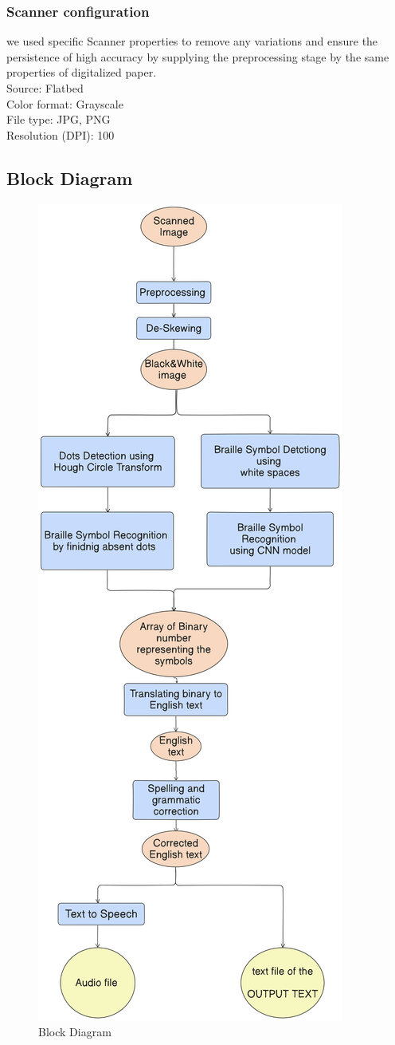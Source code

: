 \subsubsection{Scanner configuration}
we used specific Scanner properties to remove any variations and ensure the persistence of high accuracy by supplying the preprocessing stage by the same properties of digitalized paper.\\

\noindent Source: Flatbed\\
Color format:	Grayscale\\
File type: JPG, PNG\\
Resolution (DPI): 100\\


    \clearpage
\subsection{Block Diagram }

\begin{figure}[!ht]
\centering
\includegraphics[width=0.55\linewidth]{BD.png}
\caption{Block Diagram}
\label{fig:Block Diagram}
\end{figure} \\

